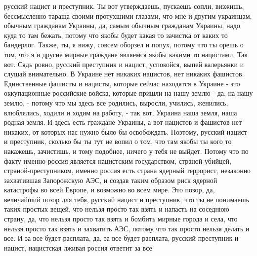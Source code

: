  
 
 
 
 

русский нацист и преступник. Ты вот утверждаешь, пускаешь сопли, визжишь,
бессмысленно тараща своими протухшими глазами, что мне и другим украинцам,
обычным гражданам Украины, да, самым обычным гражданам Украины, надо куда то
там бежать, потому что якобы будет какая то зачистка от каких то бандерлог.
Также, ты, я вижу, совсем оборзел и попух, потому что ты орешь о том, что я и
другие мирные граждане являемся якобы какими то нацистами.  Так вот. Сядь
ровно, русский преступник и нацист, успокойся, выпей валерьянки и слушай
внимательно.  В Украине нет никаких нацистов, нет никаких фашистов.
Единственные фашисты и нацисты, которые сейчас находятся в Украине - это
оккупационные российские войска, которые пришли на нашу землю - да, на нашу
землю, - потому что мы здесь все родились, выросли, учились, женились,
влюблялись, ходили и ходим на работу, - так вот, Украина наша земля, наша
родная земля.  И здесь есть граждане Украины, а вот нацистов и фашистов нет
никаких, от которых нас нужно было бы освобождать.  Поэтому, русский нацист и
преступник, сколько бы ты тут не вопил о том, что там якобы ты кого то
накажешь, зачистишь, и тому подобнее, ничего у тебя не выйдет. Потому что по
факту именно россия является нацистским государством, страной-убийцей,
страной-преступником, именно россия есть страна ядерный террорист, незаконно
захватившая Запорожскую АЭС, и создав таким образом риск ядерной катастрофы во
всей Европе, и возможно во всем мире. Это позор, да, величайший позор для тебя,
русский нацист и преступник, что ты не понимаешь таких простых вещей, что
нельзя просто так взять и напасть на соседнюю страну, да, что нельзя просто так
взять и бомбить мирные города и села, что нельзя просто так взять и захватить
АЭС, потому что так просто нельзя делать и все. И за все будет расплата, да, за
все будет расплата, русский преступник и нацист, нацистская лживая россия
ответит за все
